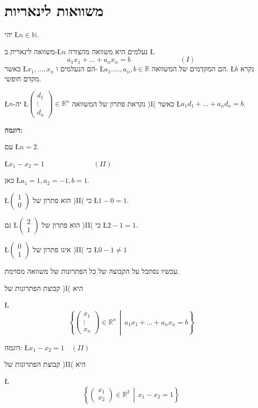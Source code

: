 \documentclass[english,hebrew]{article}
\begin{document}
\section{משוואות לינאריות}

יהי \L{$n\in\mathbb{N}$}.

משוואה לינארית ב-\L{$n$} נעלמים היא משוואה מהצורה \L{%
\[
a_{1}x_{1}+\dots+a_{n}x_{n}=b\quad\quad\quad\qquad\qquad(I)
\]
}%
כאשר \L{$x_{1},\dots,x_{n}$} הם הנעלמים ו- \L{$a_{1},\dots,a_{n},b\in\mathbb{R}$}
הם המקדמים של המשוואה. \L{$b$} נקרא מקדם חופשי.

\L{$n$}-יה \L{$\begin{pmatrix}d_{1}\\
\vdots\\
d_{n}
\end{pmatrix}\in\mathbb{R}^{n}$} נקראת פתרון של המשוואה )I( כאשר \L{$a_{1}d_{1}+...+a_{n}d_{n}=b$}.

\textbf{דוגמה:}

עם \L{$n=2$}.

\L{$x_{1}-x_{2}=1\quad\quad\quad\qquad\qquad(II)$}

כאן \L{$a_{1}=1,a_{2}=-1,b=1$}.

\L{$\begin{pmatrix}1\\
0
\end{pmatrix}$} הוא פתרון של )II( כי \L{$1-0=1$}.

גם \L{$\begin{pmatrix}2\\
1
\end{pmatrix}$} הוא פתרון של )II( כי \L{$2-1=1$}.

\L{$\begin{pmatrix}0\\
1
\end{pmatrix}$} אינו פתרון של )II( כי \L{$0-1\neq1$}

עכשיו נסתכל על הקבוצה של כל הפתרונות של משוואה מסוימת.

קבוצת הפתרונות של )I( היא

\L{%
\[
\left\{ \begin{pmatrix}x_{1}\\
\vdots\\
x_{n}
\end{pmatrix}\in\mathbb{R}^{n}\,\middle|\,a_{1}x_{1}+\dots+a_{n}x_{n}=b\right\} 
\]
}%

דוגמה: \L{$x_{1}-x_{2}=1\quad(II)$}

קבוצת הפתרונות של )II( היא

\L{%
\[
\left\{ \begin{pmatrix}x_{1}\\
x_{2}
\end{pmatrix}\in\mathbb{R}^{2}\,\middle|\,x_{1}-x_{2}=1\right\} 
\]
}%
\end{document}
